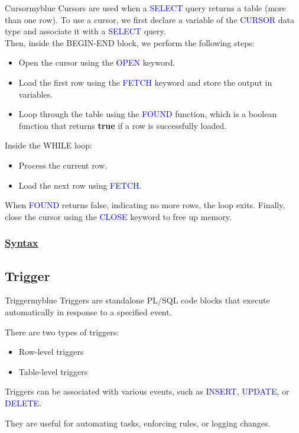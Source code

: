 \newpage


\begin{prettyBox}{Cursor}{myblue}
Cursors are used when a \textcolor{blue}{SELECT} query returns a table (more than one row).  
To use a cursor, we first declare a variable of the \textcolor{blue}{CURSOR} data type and associate it with a \textcolor{blue}{SELECT} query.\\[0.15cm]
Then, inside the BEGIN-END block, we perform the following steps:  

\begin{itemize}
    \item Open the cursor using the \textcolor{blue}{OPEN} keyword.  
    \item Load the first row using the \textcolor{blue}{FETCH} keyword and store the output in variables.  
    \item Loop through the table using the \textcolor{blue}{FOUND} function, which is a boolean function that returns \textbf{true} if a row is successfully loaded.  
\end{itemize}

Inside the WHILE loop: 
\begin{itemize}
    \item Process the current row.  
    \item Load the next row using \textcolor{blue}{FETCH}.  
\end{itemize}

When \textcolor{blue}{FOUND} returns false, indicating no more rows, the loop exits. Finally, close the cursor using the \textcolor{blue}{CLOSE} keyword to free up memory.  
\end{prettyBox}

\subsubsection*{\underline{Syntax}}

\vspace{0.25cm}

\subsection{Trigger}

\begin{prettyBox}{Trigger}{myblue}
Triggers are standalone PL/SQL code blocks that execute automatically in response to a specified event.  

\vspace{0.15cm}
There are two types of triggers:  
\begin{itemize}
    \item Row-level triggers  
    \item Table-level triggers  
\end{itemize}

Triggers can be associated with various events, such as \textcolor{blue}{INSERT}, \textcolor{blue}{UPDATE}, or \textcolor{blue}{DELETE}.  

\vspace{0.15cm}
They are useful for automating tasks, enforcing rules, or logging changes.  
\end{prettyBox}

